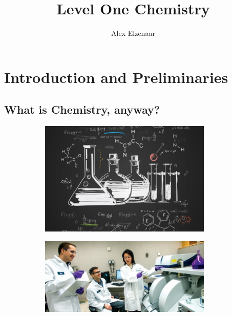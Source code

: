 \documentclass[a4paper]{memoir}
\title{Level One Chemistry}
\author{Alex Elzenaar}
\begin{document}
\maketitle
\tableofcontents

\chapter{Introduction and Preliminaries}
\section{What is Chemistry, anyway?}
\begin{figure}
  \centering
  \begin{subfigure}[t]{0.45\textwidth}
    \centering
    \includegraphics[width=0.9\textwidth]{chem1}
  \end{subfigure}%
  \begin{subfigure}[t]{0.45\textwidth}
    \centering
    \includegraphics[width=0.9\textwidth]{chem2}
  \end{subfigure}\\
  \begin{subfigure}[t]{0.45\textwidth}
    \centering

\end{subfigure}
\end{figure}
\end{document}

